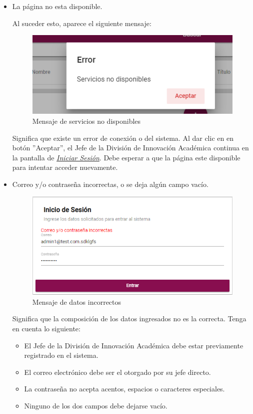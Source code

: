             \begin{itemize}
                \item La página no esta disponible.

                    Al suceder esto, aparece el siguiente mensaje:
                    \begin{figure}[H]
                        \centering
                        \hypertarget{MSG25}{\includegraphics[width=0.4\linewidth]{images/SP5/MSGSN}}
                        \caption{Mensaje de servicios no disponibles}
                    \end{figure}

                    Significa que existe un error de conexión o del sistema. Al dar clic en en botón ''Aceptar'', el Jefe de la División de Innovación Académica continua en la pantalla de \hyperlink{iniciarL}{\textit{Iniciar Sesión}}. Debe esperar a que la página este disponible para intentar acceder nuevamente.

                \item Correo y/o contraseña incorrectas, o se deja algún campo vacío.
                    \begin{figure}[H]
                        \centering
                        \hypertarget{MSG0}{\includegraphics[width=0.4\linewidth]{images/SP5/LoginIncorrecto}}
                        \caption{Mensaje de datos incorrectos}
                    \end{figure}

                Significa que la composición de los datos ingresados no es la correcta. Tenga en cuenta lo siguiente:

                            \begin{itemize}
                                \item El Jefe de la División de Innovación Académica debe estar previamente registrado en el sistema.
                                \item El correo electrónico debe ser el otorgado por su jefe directo.
                                \item La contraseña no acepta acentos, espacios o caracteres especiales.
                                \item Ninguno de los dos campos debe dejarse vacío.
                            \end{itemize}

            \end{itemize}
